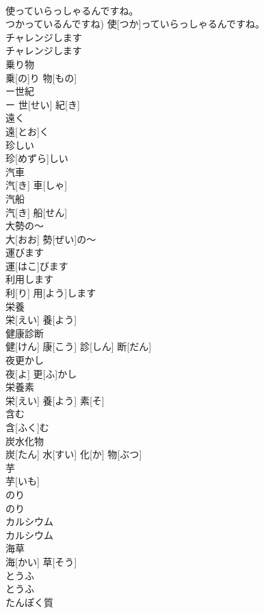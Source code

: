 \documentclass[8pt]{extreport}
\begin{document}
\begin{CJK}{UTF8}{min}
\\	使っていらっしゃるんですね。	
\\	つかっているんですね)	使[つか]っていらっしゃるんですね。		
\\	チャレンジします	
\\	チャレンジします		
\\	乗り物	
\\	乗[の]り 物[もの]		
\\	ー世紀	
\\	ー 世[せい] 紀[き]		
\\	遠く	
\\	遠[とお]く		
\\	珍しい	
\\	珍[めずら]しい		
\\	汽車	
\\	汽[き] 車[しゃ]		
\\	汽船	
\\	汽[き] 船[せん]		
\\	大勢の～	
\\	大[おお] 勢[ぜい]の～		
\\	運びます	
\\	運[はこ]びます		
\\	利用します	
\\	利[り] 用[よう]します		
\\	栄養	
\\	栄[えい] 養[よう]		
\\	健康診断	
\\	健[けん] 康[こう] 診[しん] 断[だん]		
\\	夜更かし	
\\	夜[よ] 更[ふ]かし		
\\	栄養素	
\\	栄[えい] 養[よう] 素[そ]		
\\	含む	
\\	含[ふく]む		
\\	炭水化物	
\\	炭[たん] 水[すい] 化[か] 物[ぶつ]		
\\	芋	
\\	芋[いも]		
\\	のり	
\\	のり		
\\	カルシウム	
\\	カルシウム		
\\	海草	
\\	海[かい] 草[そう]		
\\	とうふ	
\\	とうふ		
\\	たんぽく質	

\end{CJK}
\end{document}
